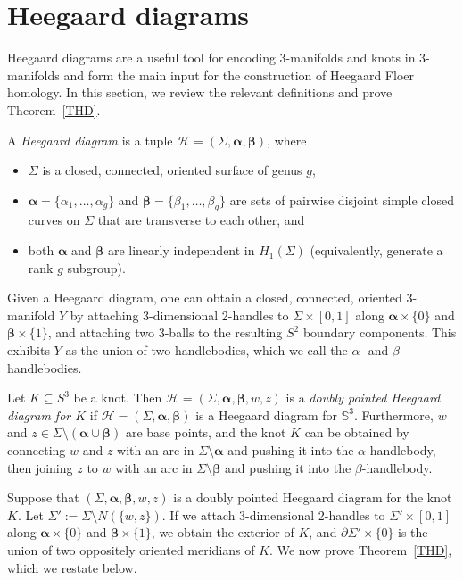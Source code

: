 \documentclass[11pt]{amsart}
\numberwithin{equation}{section}
\numberwithin{figure}{section}
\theoremstyle{definition}
\newcommand{\as}{\boldsymbol{\alpha}}
\newcommand{\bs}{\boldsymbol{\beta}}
\begin{document}
\section{Heegaard diagrams}\label{Ss:surf}

Heegaard diagrams are a useful tool for encoding $3$-manifolds and knots in $3$-manifolds and form the main input for the construction of Heegaard Floer homology. In this section, we review the relevant definitions and prove Theorem~\ref{THD}.

\begin{defn} A \emph{Heegaard diagram} is a tuple $\mathscr H=(\Sigma,\as,\bs)$, where
\begin{itemize}
\item $\Sigma$ is a closed, connected, oriented surface of genus $g$,
\item $\as=\{\alpha_1, \dots, \alpha_g\}$ and $\bs=\{\beta_1, \dots, \beta_g\}$ are sets of pairwise disjoint simple closed curves on $\Sigma$ that are transverse to each other, and
\item both $\as$ and $\bs$ are linearly independent in $H_1(\Sigma)$ (equivalently, generate a rank $g$ subgroup).
\end{itemize}
\end{defn}

Given a Heegaard diagram, one can obtain a closed, connected, oriented $3$-manifold $Y$ by attaching 3-dimensional 2-handles to $\Sigma \times [0,1]$ along $\as \times \{0\}$ and $\bs \times \{1\}$, and attaching two $3$-balls to the resulting $S^2$ boundary components. This exhibits $Y$ as the union of two handlebodies, which we call the $\alpha$- and $\beta$-handlebodies.

\begin{defn}
Let $K \subseteq S^{3}$ be a knot. Then $\mathscr H=(\Sigma,\as,\bs, w, z)$ is a \emph{doubly pointed Heegaard diagram for $K$} if $\mathscr H=(\Sigma,\as,\bs)$ is a Heegaard diagram for $\mathbb S^3$. Furthermore, $w$ and $z \in \Sigma \setminus (\as \cup \bs)$ are base points, and the knot $K$ can be obtained by connecting $w$ and $z$ with an arc in $\Sigma \setminus \as$ and pushing it into the $\alpha$-handlebody, then joining $z$ to $w$ with an arc in $\Sigma \setminus \bs$ and pushing it into the $\beta$-handlebody.
\end{defn}

Suppose that $(\Sigma,\as,\bs, w, z)$ is a doubly pointed Heegaard diagram for the knot $K$. Let $\Sigma' := \Sigma \setminus N(\{w, z\})$. If we attach 3-dimensional 2-handles to $\Sigma' \times [0,1]$ along $\as \times \{0\}$ and $\bs \times \{1\}$, we obtain the exterior of $K$, and $\partial \Sigma' \times \{0\}$ is the union of two oppositely oriented meridians of $K$. We now prove Theorem~\ref{THD}, which we restate below.
\end{document}
